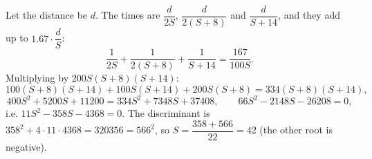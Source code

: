 Let the distance be $d$. The times are $\dfrac{d}{2S}$, $\dfrac{d}{2(S+8)}$ and $\dfrac{d}{S+14}$, and they add up to $1.67\cdot\dfrac {d}{S}$:
\[\dfrac{1}{2S}+\dfrac{1}{2(S+8)}+\dfrac{1}{S+14}=\dfrac{167}{100S}.\]
Multiplying by $200S(S+8)(S+14)$:
\[100(S+8)(S+14)+100S(S+14)+200S(S+8)=334(S+8)(S+14),\]
\[400S^2+5200S+11200=334S^2+7348S+37408,\qquad 66S^2-2148S-26208=0,\]
i.e. $11S^2-358S-4368=0$. The discriminant is $358^2+4\cdot11\cdot4368=320356=566^2$, so $S=\dfrac{358+566}{22}=\boxed{42}$ (the other root is negative).
